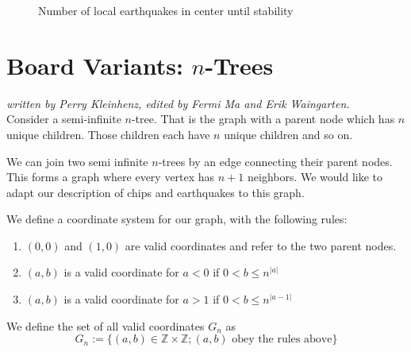 \documentclass[runningheads,a4paper]{llncs}
\begin{document}
\begin{figure}[!ht]
\centering
{} \qquad
{}
\caption{Number of local earthquakes in center until stability}
\label{fig:growthofT'}
\end{figure}



\section{Board Variants: $n$-Trees}
\label{Board Variants: n-Trees}
\emph{written by Perry Kleinhenz, edited by Fermi Ma and Erik Waingarten.}\\

Consider a semi-infinite $n$-tree. That is the graph with a parent node which has $n$ unique children. Those children each have $n$ unique children and so on. 

We can join two semi infinite $n$-trees by an edge connecting their parent nodes. This forms a graph where every vertex has $n+1$ neighbors. We would like to adapt our description of chips and earthquakes to this graph. 

\begin{definition} We define a coordinate system for our graph, with the following rules:
\begin{enumerate}
	\item $(0,0)$ and $(1,0)$ are valid coordinates and refer to the two parent nodes.
	\item $(a,b)$ is a valid coordinate for $a<0$ if $0<b \leq n^{|a|}$
	\item $(a,b)$ is a valid coordinate for $a>1$ if $0<b \leq n^{|a-1|}$
\end{enumerate}
We define the set of all valid coordinates $G_n$ as 
\begin{equation}
G_n := \{ (a,b) \in \mathbb{Z} \times \mathbb{Z} ; (a,b) \text{ obey the rules above}\}
\end{equation}
\end{definition}
\end{document}
